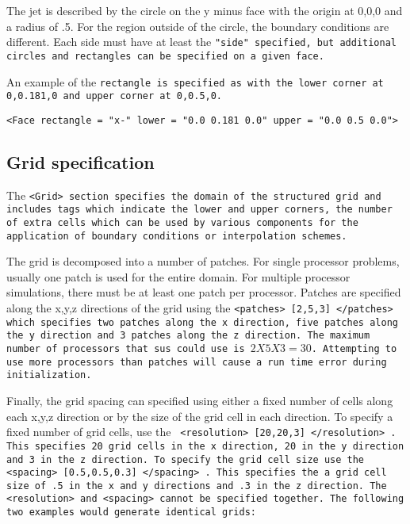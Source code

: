 The jet is described by the circle on the y minus face with the origin
at 0,0,0 and a radius of .5.  For the region outside of the circle,
the boundary conditions are different.  Each side must have at least
the \tt "side" \normalfont specified, but additional circles and
rectangles can be specified on a given face.

An example of the \tt rectangle \normalfont is specified as with the
lower corner at 0,0.181,0 and upper corner at 0,0.5,0.


\begin{Verbatim}[fontsize=\footnotesize]
 <Face rectangle = "x-" lower = "0.0 0.181 0.0" upper = "0.0 0.5 0.0">
\end{Verbatim}

%
\subsection{Grid specification} \label{Sec:Grid}

The \tt <Grid> \normalfont section specifies the domain of the
structured grid and includes tags which indicate the lower and upper
corners, the number of extra cells which can be used by various
components for the application of boundary conditions or interpolation
schemes.  

The grid is decomposed into a number of patches.  For single processor
problems, usually one patch is used for the entire domain.  For
multiple processor simulations, there must be at least one patch per
processor.  Patches are specified along the x,y,z directions of the
grid using the \tt <patches> [2,5,3] </patches> \normalfont which
specifies two patches along the x direction, five patches along the y
direction and 3 patches along the z direction.  The maximum number of
processors that \tt sus \normalfont could use is $2X5X3 = 30$.
Attempting to use more processors than patches
will cause a run time error during initialization.

Finally, the grid spacing can specified using either a fixed number of
cells along each x,y,z direction or by the size of the grid cell in
each direction.  To specify a fixed number of grid cells, use the \tt
<resolution> [20,20,3] </resolution> \normalfont.  This specifies 20
grid cells in the x direction, 20 in the y direction and 3 in the z
direction.  To specify the grid cell size use the \tt <spacing>
[0.5,0.5,0.3] </spacing> \normalfont.  This specifies the a grid cell
size of .5 in the x and y directions and .3 in the z direction.  The
\tt <resolution> \normalfont and \tt <spacing> \normalfont cannot be
specified together.  The following two examples would generate
identical grids:

